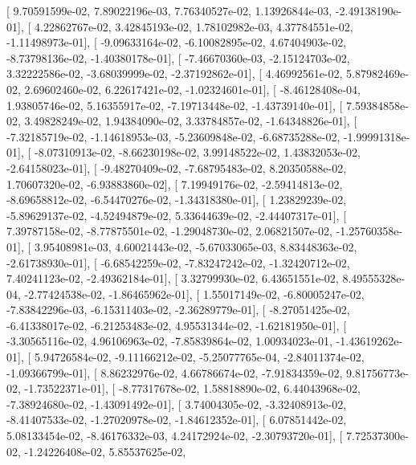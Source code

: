 \documentclass{article}
\begin{document}
       [  9.70591599e-02,   7.89022196e-03,   7.76340527e-02,
          1.13926844e-03,  -2.49138190e-01],
       [  4.22862767e-02,   3.42845193e-02,   1.78102982e-03,
          4.37784551e-02,  -1.11498973e-01],
       [ -9.09633164e-02,  -6.10082895e-02,   4.67404903e-02,
         -8.73798136e-02,  -1.40380178e-01],
       [ -7.46670360e-03,  -2.15124703e-02,   3.32222586e-02,
         -3.68039999e-02,  -2.37192862e-01],
       [  4.46992561e-02,   5.87982469e-02,   2.69602460e-02,
          6.22617421e-02,  -1.02324601e-01],
       [ -8.46128408e-04,   1.93805746e-02,   5.16355917e-02,
         -7.19713448e-02,  -1.43739140e-01],
       [  7.59384858e-02,   3.49828249e-02,   1.94384090e-02,
          3.33784857e-02,  -1.64348826e-01],
       [ -7.32185719e-02,  -1.14618953e-03,  -5.23609848e-02,
         -6.68735288e-02,  -1.99991318e-01],
       [ -8.07310913e-02,  -8.66230198e-02,   3.99148522e-02,
          1.43832053e-02,  -2.64158023e-01],
       [ -9.48270409e-02,  -7.68795483e-02,   8.20350588e-02,
          1.70607320e-02,  -6.93883860e-02],
       [  7.19949176e-02,  -2.59414813e-02,  -8.69658812e-02,
         -6.54470276e-02,  -1.34318380e-01],
       [  1.23829239e-02,  -5.89629137e-02,  -4.52494879e-02,
          5.33644639e-02,  -2.44407317e-01],
       [  7.39787158e-02,  -8.77875501e-02,  -1.29048730e-02,
          2.06821507e-02,  -1.25760358e-01],
       [  3.95408981e-03,   4.60021443e-02,  -5.67033065e-03,
          8.83448363e-02,  -2.61738930e-01],
       [ -6.68542259e-02,  -7.83247242e-02,  -1.32420712e-02,
          7.40241123e-02,  -2.49362184e-01],
       [  3.32799930e-02,   6.43651551e-02,   8.49555328e-04,
         -2.77424538e-02,  -1.86465962e-01],
       [  1.55017149e-02,  -6.80005247e-02,  -7.83842296e-03,
         -6.15311403e-02,  -2.36289779e-01],
       [ -8.27051425e-02,  -6.41338017e-02,  -6.21253483e-02,
          4.95531344e-02,  -1.62181950e-01],
       [ -3.30565116e-02,   4.96106963e-02,  -7.85839864e-02,
          1.00934023e-01,  -1.43619262e-01],
       [  5.94726584e-02,  -9.11166212e-02,  -5.25077765e-04,
         -2.84011374e-02,  -1.09366799e-01],
       [  8.86232976e-02,   4.66786674e-02,  -7.91834359e-02,
          9.81756773e-02,  -1.73522371e-01],
       [ -8.77317678e-02,   1.58818890e-02,   6.44043968e-02,
         -7.38924680e-02,  -1.43091492e-01],
       [  3.74004305e-02,  -3.32408913e-02,  -8.41407533e-02,
         -1.27020978e-02,  -1.84612352e-01],
       [  6.07851442e-02,   5.08133454e-02,  -8.46176332e-03,
          4.24172924e-02,  -2.30793720e-01],
       [  7.72537300e-02,  -1.24226408e-02,   5.85537625e-02,
\end{document}
